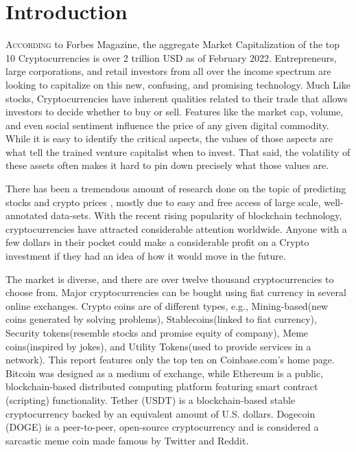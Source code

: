 \documentclass[compsoc]{IEEEtran}
\begin{document}
\section{Introduction}
\lettrine{A}{ccording} to Forbes Magazine\cite{tretina_2022}, the aggregate Market Capitalization of the top 10 Cryptocurrencies is over 2 trillion USD as of February 2022. Entrepreneurs, large corporations, and retail investors from all over the income spectrum are looking to capitalize on this new, confusing, and promising technology. Much Like stocks, Cryptocurrencies have inherent qualities related to their trade that allows investors to decide whether to buy or sell. Features like the market cap, volume, and even social sentiment influence the price of any given digital commodity. While it is easy to identify the critical aspects, the values of those aspects are what tell the trained venture capitalist when to invest. That said, the volatility of these assets often makes it hard to pin down precisely what those values are. 

There has been a tremendous amount of research done on the topic of predicting stocks and crypto prices \cite{jaquart_dann_weinhardt_2021} \cite{edsdoj.7cab738d48645d094937050d942431420211001} \cite{edseee.959642920211025}, mostly due to easy and free access of large scale, well-annotated data-sets. With the recent rising popularity of blockchain technology, cryptocurrencies have attracted considerable attention worldwide. Anyone with a few dollars in their pocket could make a considerable profit on a Crypto investment if they had an idea of how it would move in the future.

The market is diverse, and there are over twelve thousand cryptocurrencies to choose from. Major cryptocurrencies can be bought using fiat currency in several online exchanges. Crypto coins are of different types, e.g., Mining-based(new coins generated by solving problems), Stablecoins(linked to fiat currency), Security tokens(resemble stocks and promise equity of company), Meme coins(inspired by jokes), and Utility Tokens(used to provide services in a network)\cite{altcoin}. This report features only the top ten on Coinbase.com's home page. Bitcoin was designed as a medium of exchange, while Ethereum is a public, blockchain-based distributed computing platform featuring smart contract (scripting) functionality. Tether (USDT) is a blockchain-based stable cryptocurrency backed by an equivalent amount of U.S. dollars.\cite{frankenfield_2022} Dogecoin (DOGE) is a peer-to-peer, open-source cryptocurrency and is considered a sarcastic meme coin made famous by Twitter and Reddit.  
\end{document}
